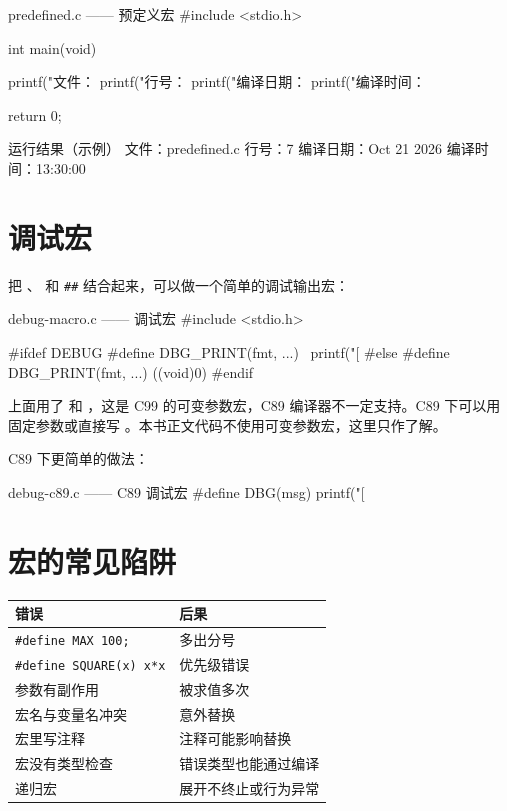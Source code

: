 \begin{codebox}{predefined.c —— 预定义宏}
#include <stdio.h>

int main(void)
{
    printf("文件：%
    printf("行号：%
    printf("编译日期：%
    printf("编译时间：%

    return 0;
}
\end{codebox}

\begin{outbox}{运行结果（示例）}
文件：predefined.c
行号：7
编译日期：Oct 21 2026
编译时间：13:30:00
\end{outbox}

\section{调试宏}

把 、 和 \texttt{\#\#} 结合起来，可以做一个简单的调试输出宏：

\begin{codebox}{debug-macro.c —— 调试宏}
#include <stdio.h>

#ifdef DEBUG
#define DBG_PRINT(fmt, ...) \
    printf("[%
#else
#define DBG_PRINT(fmt, ...) ((void)0)
#endif
\end{codebox}

\begin{note}
上面用了  和 ，这是 C99 的可变参数宏，C89 编译器不一定支持。C89 下可以用固定参数或直接写 。本书正文代码不使用可变参数宏，这里只作了解。
\end{note}

C89 下更简单的做法：

\begin{codebox}{debug-c89.c —— C89 调试宏}
#define DBG(msg) printf("[%
\end{codebox}

\section{宏的常见陷阱}

\begin{center}
\begin{tabular}{@{}p{}p{}@{}}
\toprule
错误 & 后果 \\
\midrule
\texttt{\#define MAX 100;} & 多出分号 \\
\texttt{\#define SQUARE(x) x*x} & 优先级错误 \\
参数有副作用 & 被求值多次 \\
宏名与变量名冲突 & 意外替换 \\
宏里写注释 & 注释可能影响替换 \\
宏没有类型检查 & 错误类型也能通过编译 \\
递归宏 & 展开不终止或行为异常 \\
\bottomrule
\end{tabular}
\end{center}

